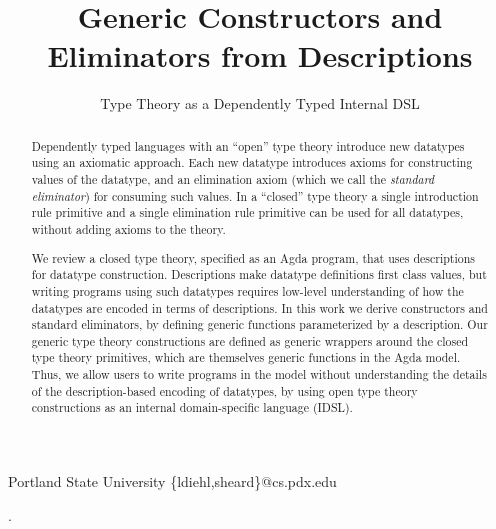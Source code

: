 \documentclass[nonatbib]{sigplanconf}
\begin{document}

\setlength{\pdfpageheight}{\paperheight}
\setlength{\pdfpagewidth}{\paperwidth}


\title{Generic Constructors and Eliminators from Descriptions}
\subtitle{Type Theory as a Dependently Typed Internal DSL}

           {Portland State University}
           {\{ldiehl,sheard\}@cs.pdx.edu}

\maketitle

\begin{abstract}
Dependently typed languages with an ``open'' type theory
introduce new datatypes using an axiomatic approach.
Each new datatype introduces axioms for constructing values
of the datatype, and an elimination axiom (which we call
the {\it standard eliminator}) for consuming such values. In a ``closed''
type theory a single introduction rule primitive and a single
elimination rule primitive can be used for all datatypes, without
adding axioms to the theory.

We review a closed type theory, specified as an {\sc Agda} program, that
uses descriptions for datatype construction. Descriptions make
datatype definitions first class values, but writing programs using
such datatypes requires low-level understanding of how the datatypes
are encoded in terms of descriptions.
In this
work we derive constructors and standard eliminators, by defining
generic functions
parameterized by a description. Our generic type theory constructions
are defined as generic wrappers around the closed type theory
primitives, which are themselves generic functions in the {\sc Agda}
model. Thus, we allow users to write programs in the model without
understanding the details of the description-based encoding of
datatypes, by using open type theory constructions as an
internal domain-specific language (IDSL).

\end{abstract}

.
\end{document}
